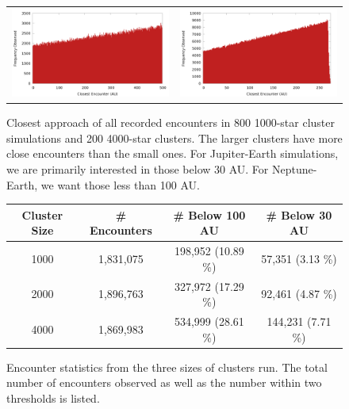 \documentclass[12pt]{article}
\begin{document}
    \begin{figure}[H]
        \centering
        \caption{Closest approach of all recorded encounters in 800 1000-star cluster 
            simulations and 200 4000-star clusters. The larger clusters have more close
            encounters than the small ones.
            For Jupiter-Earth simulations, we are primarily interested in 
            those below 30 AU. For Neptune-Earth, we want those less than 100 AU.
        }
        \label{fig:encounter_distance}
        \begin{tabular}{cc}
            \includegraphics[width=3.25in]{encounter_distance_frequency_n1000} &
            \includegraphics[width=3.25in]{encounter_distance_frequency_n4000}
        \end{tabular}
    \end{figure}

    \begin{figure}[H]
        \centering
        \caption{Encounter statistics from the three sizes of clusters run.
            The total number of encounters observed as well as the number within
            two thresholds is listed.}

        \begin{tabular}{|cccc|}
            \hline
            \textbf{Cluster Size} & \textbf{\# Encounters} & \textbf{\# Below 100 AU} 
                & \textbf{\# Below 30 AU} \\
            \hline
            1000 & 1,831,075 & 198,952 (10.89 \%) & 57,351 (3.13 \%) \\
            2000 & 1,896,763 & 327,972 (17.29 \%) & 92,461 (4.87 \%) \\
            4000 & 1,869,983 & 534,999 (28.61 \%) & 144,231 (7.71 \%) \\
            \hline
        \end{tabular}
    \end{figure}
\end{document}
